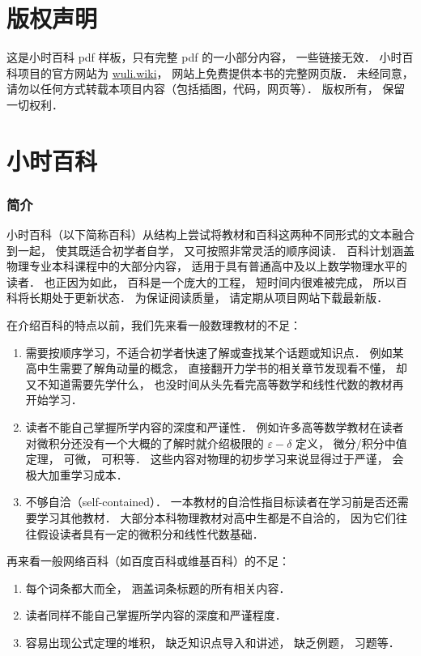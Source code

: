 
\chapter*{版权声明}

这是小时百科 pdf 样板，只有完整 pdf 的一小部分内容， 一些链接无效． 小时百科项目的官方网站为 \href{https://wuli.wiki}{wuli.wiki}， 网站上免费提供本书的完整网页版． 未经同意， 请勿以任何方式转载本项目内容（包括插图，代码，网页等）． 版权所有， 保留一切权利．

\chapter*{小时百科}

\subsection{简介}

小时百科（以下简称百科）从结构上尝试将教材和百科这两种不同形式的文本融合到一起， 使其既适合初学者自学， 又可按照非常灵活的顺序阅读． 百科计划涵盖物理专业本科课程中的大部分内容， 适用于具有普通高中及以上数学物理水平的读者． 也正因为如此， 百科是一个庞大的工程， 短时间内很难被完成， 所以百科将长期处于更新状态． 为保证阅读质量， 请定期从项目网站下载最新版．

在介绍百科的特点以前，我们先来看一般数理教材的不足：
\begin{enumerate}
\item 需要按顺序学习，不适合初学者快速了解或查找某个话题或知识点． 例如某高中生需要了解角动量的概念， 直接翻开力学书的相关章节发现看不懂， 却又不知道需要先学什么， 也没时间从头先看完高等数学和线性代数的教材再开始学习．
\item 读者不能自己掌握所学内容的深度和严谨性． 例如许多高等数学教材在读者对微积分还没有一个大概的了解时就介绍极限的 $\varepsilon-\delta$ 定义， 微分/积分中值定理， 可微， 可积等． 这些内容对物理的初步学习来说显得过于严谨， 会极大加重学习成本．
\item 不够自洽（self-contained）． 一本教材的自洽性指目标读者在学习前是否还需要学习其他教材． 大部分本科物理教材对高中生都是不自洽的， 因为它们往往假设读者具有一定的微积分和线性代数基础．
\end{enumerate}

再来看一般网络百科（如百度百科或维基百科）的不足：
\begin{enumerate}
\item 每个词条都大而全， 涵盖词条标题的所有相关内容．
\item 读者同样不能自己掌握所学内容的深度和严谨程度．
\item 容易出现公式定理的堆积， 缺乏知识点导入和讲述， 缺乏例题， 习题等．
\end{enumerate}

